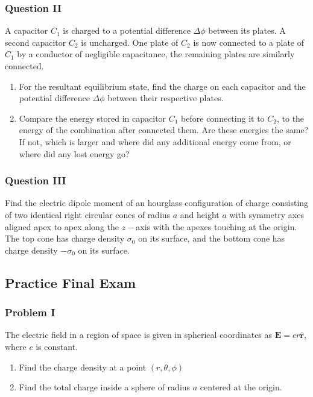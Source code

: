 \documentclass[oneside]{book}
\theoremstyle{definition}
\newcommand*\B[1]{\mathbf{#1}}
\newcommand*\Bh[1]{\mathbf{\hat{#1}}}
\begin{document}
\subsubsection{Question II}
A capacitor $C_{1}$ is charged to a potential difference $\Delta \phi$ between its plates. A second capacitor $C_{2}$ is uncharged. One plate of $C_2$ is now connected to a plate of $C_1$ by a conductor of negligible capacitance, the remaining plates are similarly connected. 
\begin{enumerate}
\item For the resultant equilibrium state, find the charge on each capacitor and the potential difference $\Delta \phi$ between their respective plates.
\item Compare the energy stored in capacitor $C_1$ before connecting it to $C_2$, to the energy of the combination after connected them. Are these energies the same? If not, which is larger and where did any additional energy come from, or where did any lost energy go?
\end{enumerate}

\subsubsection{Question III}
Find the electric dipole moment of an hourglass configuration of charge consisting of two identical right circular cones of radius $a$ and height $a$ with symmetry axes aligned apex to apex along the $z-$axis with the apexes touching at the origin. The top cone has charge density $\sigma_0$ on its surface, and the bottom cone has charge density $-\sigma_0$ on its surface.

\subsection*{Practice Final Exam}

\subsubsection{Problem I}

The electric field in a region of space is given in spherical coordinates as $\B{E} = cr\Bh{r}$, where $c$ is constant. 
\begin{enumerate}
\item Find the charge density at a point $(r,\theta,\phi)$
\item Find the total charge inside a sphere of radius $a$ centered at the origin.
\end{enumerate}
\end{document}

